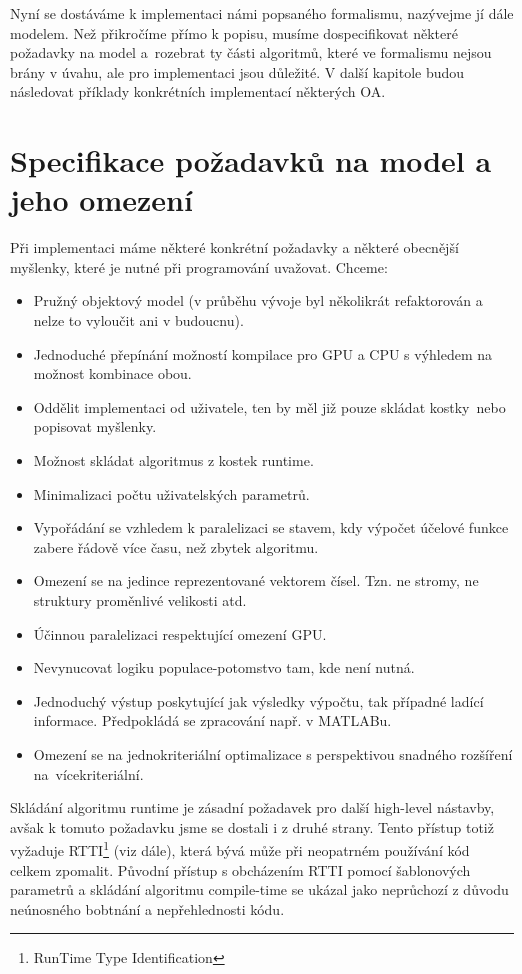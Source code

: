 
Nyní se dostáváme k implementaci námi popsaného formalismu, nazývejme jí dále modelem. Než přikročíme přímo k popisu, musíme dospecifikovat některé požadavky na model a~rozebrat ty části algoritmů, které ve formalismu nejsou brány v úvahu, ale pro implementaci jsou důležité. V další kapitole budou následovat příklady konkrétních implementací některých OA.

\section{Specifikace požadavků na model a jeho omezení}

Při implementaci máme některé konkrétní požadavky a některé obecnější myšlenky, které je nutné při programování uvažovat. Chceme:
\begin{itemize}
  \item Pružný objektový model (v průběhu vývoje byl několikrát refaktorován a nelze to vyloučit ani v budoucnu).
  \item Jednoduché přepínání možností kompilace pro GPU a CPU s výhledem na možnost kombinace obou.
  \item Oddělit implementaci od uživatele, ten by měl již pouze \bq skládat kostky\eq ~nebo popisovat myšlenky.
  \item Možnost skládat algoritmus z kostek runtime.
  \item Minimalizaci počtu uživatelských parametrů.
  \item Vypořádání se vzhledem k paralelizaci se stavem, kdy výpočet účelové funkce zabere řádově více času, než zbytek algoritmu.
  \item Omezení se na jedince reprezentované vektorem čísel. Tzn. ne stromy, ne struktury proměnlivé velikosti atd.
  \item Účinnou paralelizaci respektující omezení GPU.
  \item Nevynucovat logiku populace-potomstvo tam, kde není nutná.
  \item Jednoduchý výstup poskytující jak výsledky výpočtu, tak případné ladící informace. Předpokládá se zpracování např. v MATLABu.
  \item Omezení se na jednokriteriální optimalizace s perspektivou snadného rozšíření na~vícekriteriální.
\end{itemize}

Skládání algoritmu runtime je zásadní požadavek pro další high-level nástavby, avšak k tomuto požadavku jsme se dostali i z druhé strany. Tento přístup totiž vyžaduje RTTI\footnote{RunTime Type Identification} (viz dále), která bývá může při neopatrném používání kód celkem zpomalit. Původní přístup s obcházením RTTI pomocí šablonových parametrů a skládání algoritmu compile-time se ukázal jako neprůchozí z důvodu neúnosného bobtnání a nepřehlednosti kódu.

